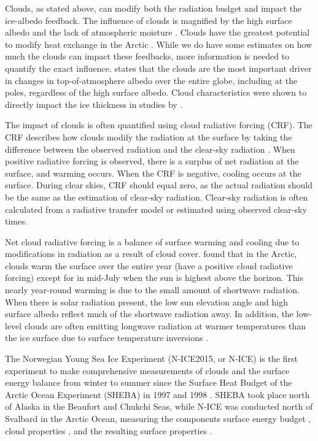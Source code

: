 Clouds, as stated above, can modify both the radiation budget and impact the ice-albedo feedback. The influence of clouds is magnified by the high surface albedo and the lack of atmospheric moisture \citep{shupe:2003}. Clouds have the greatest potential to modify heat exchange in the Arctic \citep{intrieri:2002}. While we do have some estimates on how much the clouds can impact these feedbacks, more information is needed to quantify the exact influence. \citet{sledd:2019} states that the clouds are the most important driver in changes in top-of-atmosphere albedo over the entire globe, including at the poles, regardless of the high surface albedo. Cloud characteristics were shown to directly impact the ice thickness in studies by \citet{curry:1992, beesley:2007}.  

The impact of clouds is often quantified using cloud radiative forcing (CRF). The CRF describes how clouds modify the radiation at the surface by taking the difference between the observed radiation and the clear-sky radiation \citep{ramanathan:1989}. When positive radiative forcing is observed, there is a surplus of net radiation at the surface, and warming occurs. When the CRF is negative, cooling occurs at the surface. During clear skies, CRF should equal zero, as the actual radiation should be the same as the estimation of clear-sky radiation. Clear-sky radiation is often calculated from a radiative transfer model or estimated using observed clear-sky times.

Net cloud radiative forcing is a balance of surface warming and cooling due to modifications in radiation as a result of cloud cover. \citet{curry:1992, intrieri:2002} found that in the Arctic, clouds warm the surface over the entire year (have a positive cloud radiative forcing) except for in mid-July when the sun is highest above the horizon. This nearly year-round warming is due to the small amount of shortwave radiation. When there is solar radiation present, the low sun elevation angle and high surface albedo reflect much of the shortwave radiation away. In addition, the low-level clouds are often emitting longwave radiation at warmer temperatures than the ice surface due to surface temperature inversions \citep{shupe:2003}.

The Norwegian Young Sea Ice Experiment (N-ICE2015, or N-ICE) \citep{granskog:2018} is the first experiment to make comprehensive measurements of clouds and the surface energy balance from winter to summer since the Surface Heat Budget of the Arctic Ocean Experiment (SHEBA) in 1997 and 1998 \citep{walden:2017, uttal:2002}. SHEBA took place north of Alaska in the Beaufort and Chukchi Seas, while N-ICE was conducted north of Svalbard in the Arctic Ocean, measuring the components surface energy budget \citep{persson:2002, andreas:2010, grachev:2007}, cloud properties \citep{turner:2005, turner:2002, intrieri:2002, shupe:2004}, and the resulting surface properties \citep{intrieri:2002, shupe:2004}. 

